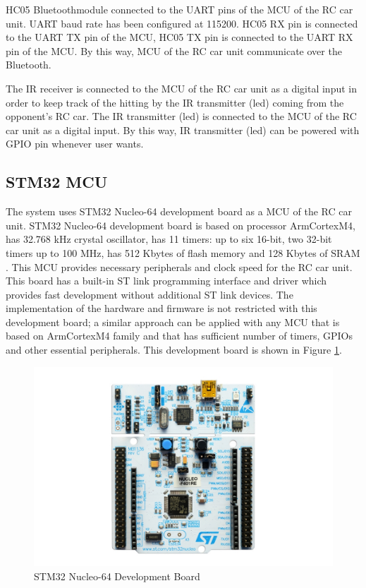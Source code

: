 HC05 Bluetooth\texttrademark\;module connected to the UART pins of the MCU of the RC car unit. UART baud rate has been configured at 115200. HC05 RX pin is connected to the UART TX pin of the MCU, HC05 TX pin is connected to the UART RX pin of the MCU. By this way, MCU of the RC car unit communicate over the Bluetooth\texttrademark.

The IR receiver is connected to the MCU of the RC car unit as a digital input in order to keep track of the hitting by the IR transmitter (led) coming from the opponent's RC car. The IR transmitter (led) is connected to the MCU of the RC car unit as a digital input. By this way, IR transmitter (led) can be powered with GPIO pin whenever user wants.


\subsection{STM32 MCU}
The system uses STM32 Nucleo-64 development board as a MCU of the RC car unit. STM32 Nucleo-64 development board is based on processor Arm\textregistered\;Cortex\textregistered\;M4, has 32.768 kHz crystal oscillator,  has 11 timers: up to six 16-bit, two 32-bit timers up to 100 MHz, has 512 Kbytes of flash memory and 128 Kbytes of SRAM \cite{One}. This MCU provides necessary peripherals and clock speed for the RC car unit. This board has a built-in ST link programming interface and driver which provides fast development without additional ST link devices. The implementation of the hardware and firmware is not restricted with this development board; a similar approach can be applied with any MCU that is based on Arm\textregistered\;Cortex\textregistered\;M4 family and that has sufficient number of timers, GPIOs and other essential peripherals. This development board is shown in Figure \ref{fig:nucleo64_board}.

\begin{figure}[!htbp]
    \centering
    \includegraphics[width=1\textwidth]{Imgs/nucleo64.jpg}
    \caption{\label{fig:nucleo64_board}STM32 Nucleo-64 Development Board \cite{One}}
\end{figure}

